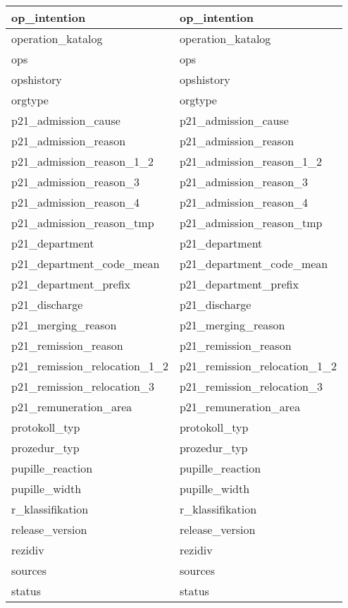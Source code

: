 \begin{longtable}{||l|l||}
  	op\_intention & op\_intention\\ \hline
  	operation\_katalog & operation\_katalog\\ \hline
  	ops & ops\\ \hline
  	opshistory & opshistory\\ \hline
  	orgtype & orgtype\\ \hline
  	p21\_admission\_cause & p21\_admission\_cause\\ \hline
  	p21\_admission\_reason & p21\_admission\_reason\\ \hline
  	p21\_admission\_reason\_1\_2 & p21\_admission\_reason\_1\_2\\ \hline
  	p21\_admission\_reason\_3 & p21\_admission\_reason\_3\\ \hline
  	p21\_admission\_reason\_4 & p21\_admission\_reason\_4\\ \hline
  	p21\_admission\_reason\_tmp & p21\_admission\_reason\_tmp\\ \hline
  	p21\_department & p21\_department\\ \hline
  	p21\_department\_code\_mean & p21\_department\_code\_mean\\ \hline
  	p21\_department\_prefix & p21\_department\_prefix\\ \hline
  	p21\_discharge & p21\_discharge\\ \hline
  	p21\_merging\_reason & p21\_merging\_reason\\ \hline
  	p21\_remission\_reason & p21\_remission\_reason\\ \hline
  	p21\_remission\_relocation\_1\_2 & p21\_remission\_relocation\_1\_2\\ \hline
  	p21\_remission\_relocation\_3 & p21\_remission\_relocation\_3\\ \hline
  	p21\_remuneration\_area & p21\_remuneration\_area\\ \hline
  	protokoll\_typ & protokoll\_typ\\ \hline
  	prozedur\_typ & prozedur\_typ\\ \hline
  	pupille\_reaction & pupille\_reaction\\ \hline
  	pupille\_width & pupille\_width\\ \hline
  	r\_klassifikation & r\_klassifikation\\ \hline
  	release\_version & release\_version\\ \hline
  	rezidiv & rezidiv\\ \hline
  	sources & sources\\ \hline
  	status & status\\ \hline

\end{longtable}
